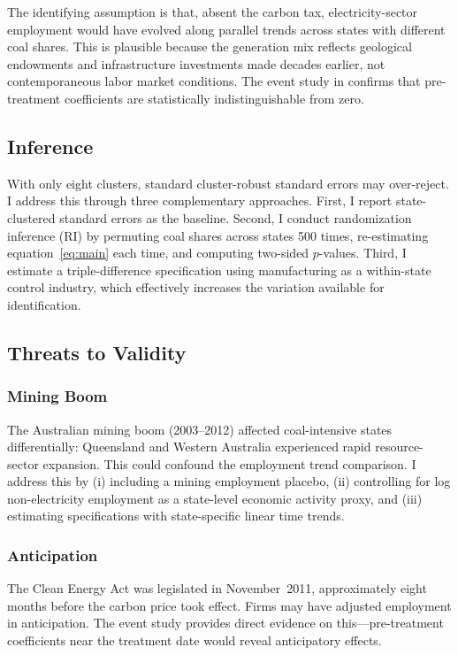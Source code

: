 \documentclass[12pt]{article}
\begin{document}
The identifying assumption is that, absent the carbon tax, electricity-sector employment would have evolved along parallel trends across states with different coal shares. This is plausible because the generation mix reflects geological endowments and infrastructure investments made decades earlier, not contemporaneous labor market conditions. The event study in  confirms that pre-treatment coefficients are statistically indistinguishable from zero.

\subsection{Inference}

With only eight clusters, standard cluster-robust standard errors may over-reject. I address this through three complementary approaches. First, I report state-clustered standard errors as the baseline. Second, I conduct randomization inference (RI) by permuting coal shares across states 500 times, re-estimating equation~\eqref{eq:main} each time, and computing two-sided $p$-values. Third, I estimate a triple-difference specification using manufacturing as a within-state control industry, which effectively increases the variation available for identification.

\subsection{Threats to Validity}

\subsubsection*{Mining Boom} The Australian mining boom (2003--2012) affected coal-intensive states differentially: Queensland and Western Australia experienced rapid resource-sector expansion. This could confound the employment trend comparison. I address this by (i) including a mining employment placebo, (ii) controlling for log non-electricity employment as a state-level economic activity proxy, and (iii) estimating specifications with state-specific linear time trends.

\subsubsection*{Anticipation} The Clean Energy Act was legislated in November~2011, approximately eight months before the carbon price took effect. Firms may have adjusted employment in anticipation. The event study provides direct evidence on this---pre-treatment coefficients near the treatment date would reveal anticipatory effects.
\end{document}

